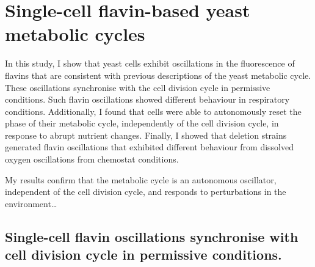 
\chapter{Single-cell flavin-based yeast metabolic cycles}
\label{ch:biology}


In this study, I show that yeast cells exhibit oscillations in the fluorescence of flavins that are consistent with previous descriptions of the yeast metabolic cycle.
These oscillations synchronise with the cell division cycle in permissive conditions.
Such flavin oscillations showed different behaviour in respiratory conditions.
Additionally, I found that cells were able to autonomously reset the phase of their metabolic cycle, independently of the cell division cycle, in response to abrupt nutrient changes.
Finally, I showed that deletion strains generated flavin oscillations that exhibited different behaviour from dissolved oxygen oscillations from chemostat conditions.

My results confirm that the metabolic cycle is an autonomous oscillator, independent of the cell division cycle, and responds to perturbations in the environment\ldots{}

\section[Permissive conditions]{Single-cell flavin oscillations synchronise with cell division cycle in permissive conditions.}
\label{sec:biology-sync}

